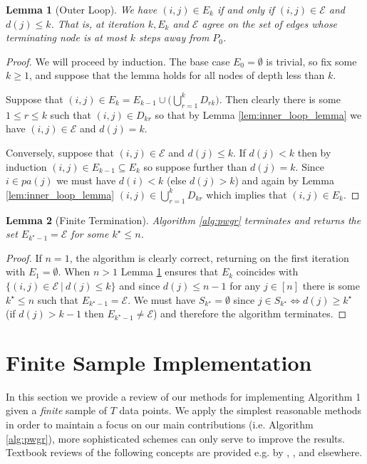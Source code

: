 \documentclass{statsoc}
\newcounter{lemma}
\def\gcge{\mathcal{E}}  %
\newcommand{\pa}[1]{pa(#1)}  %
\newtheorem{lemma}{Lemma}
\begin{document}
\begin{lemma}[Outer Loop]
  \label{lem:outer_loop_lemma}
  We have $(i, j) \in E_k$ if and only if $(i, j) \in \gcge$ and
  $d(j) \le k$.  That is, at iteration $k, E_k$ and $\gcge$ agree on
  the set of edges whose terminating node is at most $k$ steps away
  from $P_0$.
\end{lemma}
\begin{proof}
  We will proceed by induction.  The base case $E_0 = \emptyset$ is
  trivial, so fix some $k \ge 1$, and suppose that the lemma holds for
  all nodes of depth less than $k$.

  Suppose that
  $(i, j) \in E_k = E_{k - 1}\cup \big(\bigcup_{r = 1}^k D_{rk}
  \big)$.  Then clearly there is some $1 \le r \le k$ such that
  $(i, j) \in D_{kr}$ so that by Lemma \ref{lem:inner_loop_lemma} we
  have $(i, j) \in \gcge$ and $d(j) = k$.

  Conversely, suppose that $(i, j) \in \gcge$ and $d(j) \le k$.  If
  $d(j) < k$ then by induction $(i, j) \in E_{k - 1} \subseteq E_k$ so
  suppose further than $d(j) = k$.  Since $i \in \pa{j}$ we must have
  $d(i) < k$ (else $d(j) > k$) and again by Lemma
  \ref{lem:inner_loop_lemma} $(i, j) \in \bigcup_{r = 1}^k D_{kr}$
  which implies that $(i, j) \in E_k$.
\end{proof}

\begin{lemma}[Finite Termination]
  Algorithm \ref{alg:pwgr} terminates and returns the set
  $E_{k^\star - 1} = \gcge$ for some $k^\star \le n$.
\end{lemma}
\begin{proof}
  If $n = 1$, the algorithm is clearly correct, returning on the first
  iteration with $E_1 = \emptyset$.  When $n > 1$ Lemma
  \ref{lem:outer_loop_lemma} ensures that $E_k$ coincides with
  $\{(i, j) \in \gcge\ |\ d(j) \le k\}$ and since $d(j) \le n - 1$ for
  any $j \in [n]$ there is some $k^\star \le n$ such that
  $E_{k^\star - 1} = \gcge$.  We must have $S_{k^\star} = \emptyset$
  since $j \in S_{k^\star} \iff d(j) \ge k^\star$ (if $d(j) > k - 1$ then
  $E_{k^\star - 1} \ne \gcge$) and therefore the algorithm terminates.
\end{proof}

\section{Finite Sample Implementation}
\label{sec:structure_learning}
In this section we provide a review of our methods for implementing
Algorithm 1 given a \textit{finite} sample of $T$ data points.  We
apply the simplest reasonable methods in order to maintain a focus on
our main contributions (i.e. Algorithm \ref{alg:pwgr}), more
sophisticated schemes can only serve to improve the results.  Textbook
reviews of the following concepts are provided e.g. by
\cite{all_of_statistics}, \cite{murphy_mlp}, and elsewhere.
\end{document}
